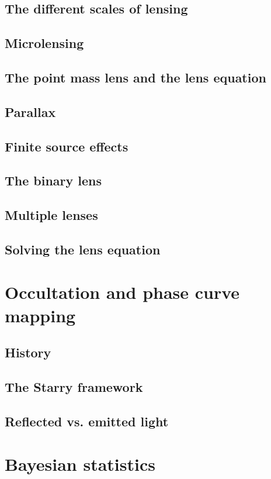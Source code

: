 \documentclass[]{report}
\begin{document}
\subsection{The different scales of lensing}
\subsection{Microlensing}
\subsection{The point mass lens and the lens equation}
\subsection{Parallax}
\subsection{Finite source effects}
\subsection{The binary lens}
\subsection{Multiple lenses}
\subsection{Solving the lens equation}

\section{Occultation and phase curve mapping}
\subsection{History}
\subsection{The Starry framework}
\subsection{Reflected vs. emitted light}

\section{Bayesian statistics}
\end{document}
